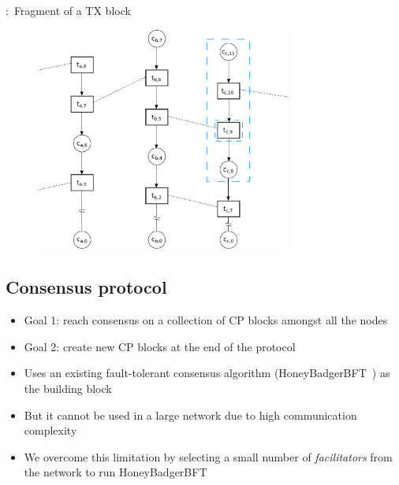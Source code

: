 \documentclass{beamer}
\begin{document}
\begin{frame}{\subsecname:~Fragment of a TX block}
  \begin{figure}[h]
  \includegraphics[width=0.75\textwidth]{trustchain-good-cp-frag}
  \centering
  \end{figure}
\end{frame}

\subsection{Consensus protocol}

\begin{frame}{\subsecname}
  \begin{itemize}
    \item Goal 1: reach consensus on a collection of CP blocks amongst all the nodes
    \item Goal 2: create new CP blocks at the end of the protocol
    \item Uses an existing fault-tolerant consensus algorithm (HoneyBadgerBFT~\cite{miller2016honey}) as the building block
    \item But it cannot be used in a large network due to high communication complexity
    \item We overcome this limitation by selecting a small number of \emph{facilitators} from the network to run HoneyBadgerBFT
  \end{itemize}
\end{frame}
\end{document}

